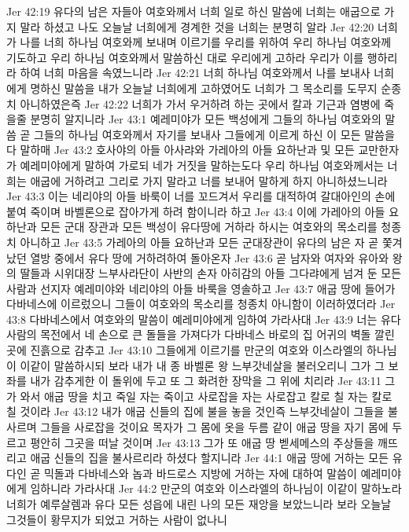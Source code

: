 Jer 42:19  유다의 남은 자들아 여호와께서 너희 일로 하신 말씀에 너희는 애굽으로 가지 말라 하셨고 나도 오늘날 너희에게 경계한 것을 너희는 분명히 알라
Jer 42:20  너희가 나를 너희 하나님 여호와께 보내며 이르기를 우리를 위하여 우리 하나님 여호와께 기도하고 우리 하나님 여호와께서 말씀하신 대로 우리에게 고하라 우리가 이를 행하리라 하여 너희 마음을 속였느니라
Jer 42:21  너희 하나님 여호와께서 나를 보내사 너희에게 명하신 말씀을 내가 오늘날 너희에게 고하였어도 너희가 그 목소리를 도무지 순종치 아니하였은즉
Jer 42:22  너희가 가서 우거하려 하는 곳에서 칼과 기근과 염병에 죽을줄 분명히 알지니라
Jer 43:1  예레미야가 모든 백성에게 그들의 하나님 여호와의 말씀 곧 그들의 하나님 여호와께서 자기를 보내사 그들에게 이르게 하신 이 모든 말씀을 다 말하매
Jer 43:2  호사야의 아들 아사랴와 가레아의 아들 요하난과 및 모든 교만한자가 예레미야에게 말하여 가로되 네가 거짓을 말하는도다 우리 하나님 여호와께서는 너희는 애굽에 거하려고 그리로 가지 말라고 너를 보내어 말하게 하지 아니하셨느니라
Jer 43:3  이는 네리야의 아들 바룩이 너를 꼬드겨서 우리를 대적하여 갈대아인의 손에 붙여 죽이며 바벨론으로 잡아가게 하려 함이니라 하고
Jer 43:4  이에 가레아의 아들 요하난과 모든 군대 장관과 모든 백성이 유다땅에 거하라 하시는 여호와의 목소리를 청종치 아니하고
Jer 43:5  가레아의 아들 요하난과 모든 군대장관이 유다의 남은 자 곧 쫓겨났던 열방 중에서 유다 땅에 거하려하여 돌아온자
Jer 43:6  곧 남자와 여자와 유아와 왕의 딸들과 시위대장 느부사라단이 사반의 손자 아히감의 아들 그다랴에게 넘겨 둔 모든 사람과 선지자 예레미야와 네리야의 아들 바룩을 영솔하고
Jer 43:7  애굽 땅에 들어가 다바네스에 이르렀으니 그들이 여호와의 목소리를 청종치 아니함이 이러하였더라
Jer 43:8  다바네스에서 여호와의 말씀이 예레미야에게 임하여 가라사대
Jer 43:9  너는 유다 사람의 목전에서 네 손으로 큰 돌들을 가져다가 다바네스 바로의 집 어귀의 벽돌 깔린 곳에 진흙으로 감추고
Jer 43:10  그들에게 이르기를 만군의 여호와 이스라엘의 하나님이 이같이 말씀하시되 보라 내가 내 종 바벨론 왕 느부갓네살을 불러오리니 그가 그 보좌를 내가 감추게한 이 돌위에 두고 또 그 화려한 장막을 그 위에 치리라
Jer 43:11  그가 와서 애굽 땅을 치고 죽일 자는 죽이고 사로잡을 자는 사로잡고 칼로 칠 자는 칼로 칠 것이라
Jer 43:12  내가 애굽 신들의 집에 불을 놓을 것인즉 느부갓네살이 그들을 불사르며 그들을 사로잡을 것이요 목자가 그 몸에 옷을 두름 같이 애굽 땅을 자기 몸에 두르고 평안히 그곳을 떠날 것이며
Jer 43:13  그가 또 애굽 땅 벧세메스의 주상들을 깨뜨리고 애굽 신들의 집을 불사르리라 하셨다 할지니라
Jer 44:1  애굽 땅에 거하는 모든 유다인 곧 믹돌과 다바네스와 놉과 바드로스 지방에 거하는 자에 대하여 말씀이 예레미야에게 임하니라 가라사대
Jer 44:2  만군의 여호와 이스라엘의 하나님이 이같이 말하노라 너희가 예루살렘과 유다 모든 성읍에 내린 나의 모든 재앙을 보았느니라 보라 오늘날 그것들이 황무지가 되었고 거하는 사람이 없나니
